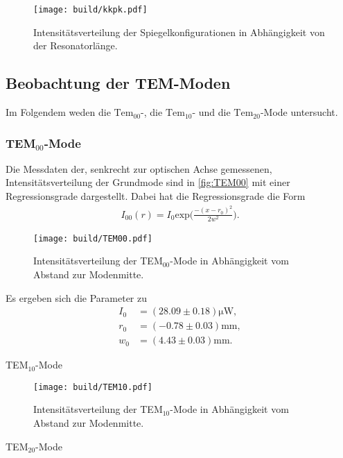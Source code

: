 \begin{figure}[H]
  \centering
  \texttt{[image: build/kkpk.pdf]}
  \caption {Intensitätsverteilung der Spiegelkonfigurationen in Abhängigkeit von der Resonatorlänge.}
  \label{fig:kkpk}
\end{figure}

\subsection{Beobachtung der TEM-Moden}
\label{subsec:Moden_aus}
Im Folgendem weden die $\text{Tem}_{00}$-, die $\text{Tem}_{10}$- und die $\text{Tem}_{20}$-Mode untersucht.

\subsubsection{TEM$_{00}$-Mode}
\label{subsubsec:00Mode}
Die Messdaten der, senkrecht zur optischen Achse gemessenen, Intensitätsverteilung der Grundmode sind in \autoref{fig:TEM00} mit einer Regressionsgrade dargestellt.
Dabei hat die Regressionsgrade die Form
\begin{align*}
  I_{00}(r) = I_0 \text{exp}\Biggl(\frac{-(x-r_0)^2}{2 w^2}\Biggr).
\end{align*}

\begin{figure}[H]
  \centering
  \texttt{[image: build/TEM00.pdf]}
  \caption {Intensitätsverteilung der TEM$_{00}$-Mode in Abhängigkeit vom Abstand zur Modenmitte.}
  \label{fig:TEM00}
\end{figure}

Es ergeben sich die Parameter zu
\begin{align*}
  I_{0} &= (28.09 \pm 0.18) \si{\micro\W},\\
  r_0 &= (-0.78 \pm 0.03) \si{\milli\meter},\\
  w_0 &= (4.43 \pm 0.03) \si{\milli\meter}.
\end{align*}




TEM$_{10}$-Mode

\begin{figure}[H]
  \centering
  \texttt{[image: build/TEM10.pdf]}
  \caption {Intensitätsverteilung der TEM$_{10}$-Mode in Abhängigkeit vom Abstand zur Modenmitte.}
  \label{fig:TEM10}
\end{figure}

TEM$_{20}$-Mode

